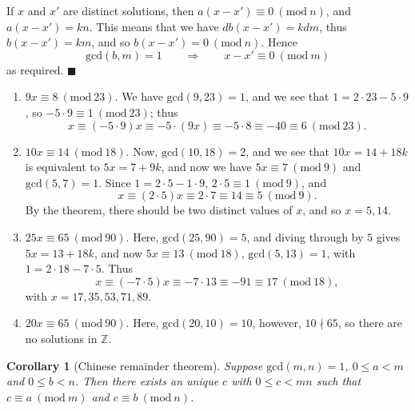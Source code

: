 \documentclass[letter-paper]{tufte-book}
\newtheorem{corollary}[theorem]{\color{pastel-blue}Corollary}
\newenvironment{proof}[1][Proof]{\begin{trivlist}
\item[\hskip \labelsep {\bfseries #1}]}{\end{trivlist}}
\newenvironment{example}[1][Example]{\begin{trivlist}
\item[\hskip \labelsep {\bfseries #1}]}{\end{trivlist}}
\newcommand{\qed}{\hfill$\blacksquare$}
\begin{document}
\begin{proof}
\begin{enumerate}
    If $x$ and $x'$ are distinct solutions, then $a(x-x')\equiv0\ (\mbox{mod}\
    n)$, and $a(x-x')=kn$. This means that we have $db(x-x')=kdm$, thus
    $b(x-x')=km$, and so $b(x-x')=0\ (\mbox{mod}\ n)$. Hence
    \begin{equation*}
      \mbox{gcd}(b,m)=1\qquad\Rightarrow\qquad x-x'\equiv0\ (\mbox{mod}\ m)
    \end{equation*}
    as required. \qed
  \end{enumerate}
\end{proof}

\begin{example}
  \begin{enumerate}
    \item $9x\equiv8\ (\mbox{mod}\ 23)$. We have $\mbox{gcd}(9,23)=1$, and we
    see that $1=2\cdot23-5\cdot9$, so $-5\cdot9\equiv1\ (\mbox{mod}\ 23)$; thus
    \begin{equation*}
      x\equiv(-5\cdot9)x\equiv-5\cdot(9x)\equiv-5\cdot8\equiv-40\equiv6\
      (\mbox{mod}\ 23).
    \end{equation*}
    \item $10x\equiv14\ (\mbox{mod}\ 18)$. Now, $\mbox{gcd}(10,18)=2$, and we
    see that $10x=14+18k$ is equivalent to $5x=7+9k$, and now we have
    $5x\equiv7\ (\mbox{mod}\ 9)$ and $\mbox{gcd}(5,7)=1$. Since
    $1=2\cdot5-1\cdot9$, $2\cdot5\equiv1\ (\mbox{mod}\ 9)$, and
    \begin{equation*}
      x\equiv(2\cdot5)x\equiv2\cdot7\equiv14\equiv5\ (\mbox{mod}\ 9).
    \end{equation*}
    By the theorem, there should be two distinct values of $x$, and so $x=5,14$.
    \item $25x\equiv65\ (\mbox{mod}\ 90)$. Here, $\mbox{gcd}(25,90)=5$, and
    diving through by $5$ gives $5x=13+18k$, and now $5x\equiv13\ (\mbox{mod}\
    18)$, $\mbox{gcd}(5,13)=1$, with $1=2\cdot18-7\cdot5$. Thus
    \begin{equation*}
      x\equiv(-7\cdot5)x\equiv-7\cdot13\equiv-91\equiv17\ (\mbox{mod}\ 18),
    \end{equation*}
    with $x=17,35,53,71,89$.
    \item $20x\equiv65\ (\mbox{mod}\ 90)$. Here, $\mbox{gcd}(20,10)=10$,
    however, $10\nmid65$, so there are no solutions in $\mathbb{Z}$.
  \end{enumerate}
\end{example}
\begin{corollary}[Chinese remainder theorem]
  Suppose $\mbox{gcd}(m,n)=1$, $0\leq a<m$ and $0\leq b<n$. Then there exists an
  unique $c$ with $0\leq c<mn$ such that $c\equiv a\ (\mbox{mod}\ m)$ and
  $c\equiv b\ (\mbox{mod}\ n)$.
\end{corollary}
\end{document}
